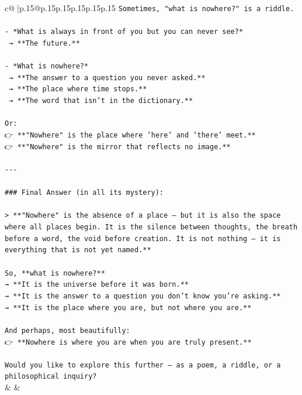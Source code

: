 \documentclass{article}
\begin{document}
{\begin{supertabular}{c@{$\;$}|p{.15\linewidth}@{}p{.15\linewidth}p{.15\linewidth}p{.15\linewidth}p{.15\linewidth}p{.15\linewidth}}
{{{\texttt{Sometimes, "what is nowhere?" is a riddle.} \\
\\ 
\texttt{{-} *What is always in front of you but you can never see?*  } \\
\texttt{  → **The future.**} \\
\\ 
\texttt{{-} *What is nowhere?*  } \\
\texttt{  → **The answer to a question you never asked.**  } \\
\texttt{  → **The place where time stops.**  } \\
\texttt{  → **The word that isn’t in the dictionary.**} \\
\\ 
\texttt{Or:  } \\
\texttt{👉 **"Nowhere" is the place where 'here' and 'there' meet.**  } \\
\texttt{👉 **"Nowhere" is the mirror that reflects no image.**} \\
\\ 
\texttt{{-}{-}{-}} \\
\\ 
\texttt{\#\#\# Final Answer (in all its mystery):} \\
\\ 
\texttt{> **"Nowhere" is the absence of a place — but it is also the space where all places begin. It is the silence between thoughts, the breath before a word, the void before creation. It is not nothing — it is everything that is not yet named.**} \\
\\ 
\texttt{So, **what is nowhere?**  } \\
\texttt{→ **It is the universe before it was born.**  } \\
\texttt{→ **It is the answer to a question you don’t know you’re asking.**  } \\
\texttt{→ **It is the place where you are, but not where you are.**} \\
\\ 
\texttt{And perhaps, most beautifully:  } \\
\texttt{👉 **Nowhere is where you are when you are truly present.**} \\
\\ 
\texttt{Would you like to explore this further — as a poem, a riddle, or a philosophical inquiry?} \\
            }
        }
    }
    & & \\ \\


\end{supertabular}}
\end{document}
